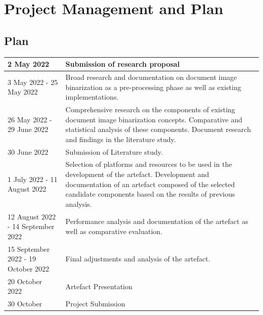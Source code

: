 \documentclass[a4paper, 12pt]{report}
\begin{document}
\section{Project Management and Plan}
\subsection{Plan}
\begin{center}
    \begin{tabular}{ | m{6cm} | m{10cm} | }
        \hline
        2 May 2022                          & Submission of research proposal                                                                                                \\
        \hline
        3 May 2022 - 25 May 2022            & Broad research and documentation on document image binarization as a pre-processing phase as well as existing implementations. \\
        \hline
        26 May 2022 - 29 June 2022          & Comprehensive research on the components of existing document image binarization concepts.
        Comparative and statistical analysis of these components.
        Document research and findings in the literature study.                                                                                                              \\
        \hline
        30 June 2022                        & Submission of Literature study.                                                                                                \\
        \hline
        1 July 2022 - 11 August 2022        & Selection of platforms and resources to be used in the development of the artefact.
        Development and documentation of an artefact composed of the selected candidate components based on the results of previous analysis.                                \\
        \hline
        12 August 2022 - 14 September 2022  & Performance analysis and documentation of the artefact as well as comparative evaluation.                                      \\
        \hline
        15 September 2022 - 19 October 2022 & Final adjustments and analysis of the artefact.                                                                                \\
        \hline
        20 October 2022                     & Artefact Presentation                                                                                                          \\
        \hline
        30 October                          & Project Submission                                                                                                             \\
        \hline
    \end{tabular}
\end{center}
\end{document}
